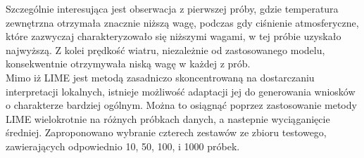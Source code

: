 \documentclass[a4paper,twoside,12pt]{book}
\begin{document}
Szczególnie interesująca jest obserwacja z pierwszej próby, gdzie temperatura zewnętrzna otrzymała znacznie niższą wagę, podczas gdy ciśnienie atmosferyczne, które zazwyczaj charakteryzowało się niższymi wagami, w tej próbie uzyskało najwyższą. Z kolei prędkość wiatru, niezależnie od zastosowanego modelu, konsekwentnie otrzymywała niską wagę w każdej z prób.\\

Mimo iż LIME jest metodą zasadniczo skoncentrowaną na dostarczaniu interpretacji lokalnych, istnieje możliwość adaptacji jej do generowania wniosków o charakterze bardziej ogólnym. Można to osiągnąć poprzez zastosowanie metody LIME wielokrotnie na różnych próbkach danych, a nastepnie wyciąganięcie średniej. Zaproponowano wybranie czterech zestawów ze zbioru testowego, zawierających odpowiednio 10, 50, 100, i 1000 próbek.
\end{document}
